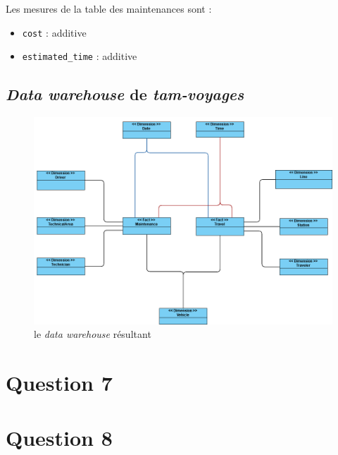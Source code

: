 \documentclass[a4paper,12pt]{report}
\begin{document}
Les mesures de la table des maintenances sont :
\begin{itemize}
  \item \texttt{cost} : additive
  \item \texttt{estimated\_time} : additive
\end{itemize}

\newpage

\subsection*{\textit{Data warehouse} de \textit{tam-voyages}}
\label{subsec:data_warehouse}
\begin{figure}[!ht]
  \centering
  \includegraphics[scale=0.6]{images/data_warehouse.png}
  \caption{le \textit{data warehouse} résultant}
\end{figure}

\newpage

\section*{Question 7}
\label{sec:question_7}

\section*{Question 8}
\label{sec:question_8}
\begin{table}[!ht]
  \centering
  \caption{Travel}
\end{table}
\end{document}
